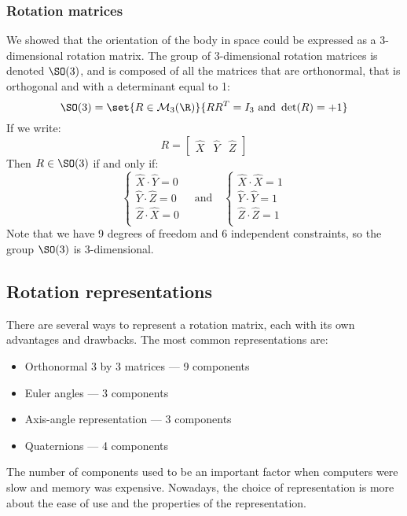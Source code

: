 \subsubsection{Rotation matrices}
We showed that the orientation of the body in space could be expressed as a 3-dimensional rotation matrix. The group of 3-dimensional rotation matrices is denoted $\SO(3)$, and is composed of all the matrices that are orthonormal, that is orthogonal and with a determinant equal to 1:
\begin{equation*}
    \SO(3) = \set{R\in\mathcal{M}_{3}(\R)}{RR^T=I_3 \text{ and } \det(R) = +1}
\end{equation*}
If we write:
\begin{equation*}
    R = \begin{bmatrix}
        \hat{X} & \hat{Y} & \hat{Z}
    \end{bmatrix}
\end{equation*}
Then $R\in\SO(3)$ if and only if:
\begin{equation*}
    \begin{cases}
        \hat{X}\cdot\hat{Y} = 0 \\
        \hat{Y}\cdot\hat{Z} = 0 \\
        \hat{Z}\cdot\hat{X} = 0 \\
    \end{cases}
    \quad\text{and}\quad
    \begin{cases}
        \hat{X}\cdot\hat{X} = 1 \\
        \hat{Y}\cdot\hat{Y} = 1 \\
        \hat{Z}\cdot\hat{Z} = 1 \\
    \end{cases}
\end{equation*}
Note that we have 9 degrees of freedom and 6 independent constraints, so the group $\SO(3)$ is 3-dimensional.

\subsection{Rotation representations}
There are several ways to represent a rotation matrix, each with its own advantages and drawbacks. The most common representations are:
\begin{itemize}
    \item Orthonormal 3 by 3 matrices --- 9 components
    \item Euler angles --- 3 components
    \item Axis-angle representation --- 3 components
    \item Quaternions --- 4 components
\end{itemize}
The number of components used to be an important factor when computers were slow and memory was expensive. Nowadays, the choice of representation is more about the ease of use and the properties of the representation.


